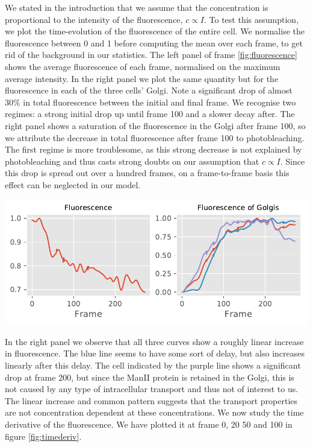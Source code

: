 \documentclass{Dissertate}
\let\origfigure\figure
\let\endorigfigure\endfigure
\renewenvironment{figure}[1][2] {
    \expandafter\origfigure\expandafter[H]
} {
    \endorigfigure
}
\begin{document}
We stated in the introduction that we assume that the concentration is proportional to the intensity of the fluorescence, $c\propto I$. To test this assumption, we plot the time-evolution of the fluorescence of the entire cell. We normalise the fluorescence between 0 and 1 before computing the mean over each frame, to get rid of the background in our statistics. The left panel of frame \ref{fig:fluorescence} shows the average fluorescence of each frame, normalised on the maximum average intensity. In the right panel we plot the same quantity but for the fluorescence in each of the three cells' Golgi. Note a significant drop of almost \(30\%\) in total fluorescence between the initial and final frame. We recognise two regimes: a strong initial drop up until frame 100 and a slower decay after. The right panel shows a saturation of the fluorescence in the Golgi after frame 100, so we attribute the decrease in total fluorescence after frame 100 to photobleaching. 
The first regime is more troublesome, as this strong decrease is not explained by photobleaching and thus casts strong doubts on our assumption that $c \propto I$. Since this drop is spread out over a hundred frames, on a frame-to-frame basis this effect can be neglected in our model.

\begin{figure}
	\centering
	\includegraphics{source/figures/pdf/general_fluorescence.pdf}
	\caption{\textbf{Left panel:} Normalised total fluorescence per frame. \textbf{Right panel:}Normalised fluorescence in each of the three cells' Golgi.\label{fig:fluorescence}}
\end{figure}

In the right panel we observe that all three curves show a roughly linear increase in fluorescence. The blue line seems to have some sort of delay, but also increases linearly after this delay. The cell indicated by the purple line shows a significant drop at frame 200, but
since the ManII protein is retained in the Golgi, this is not caused by any
type of intracellular transport and thus not of interest to us. The
linear increase and common pattern suggests that the transport
properties are not concentration dependent at these concentrations. We now study the time derivative of the fluorescence. We have plotted it at frame 0, 20 50 and 100 in figure \ref{fig:timederiv}.
\end{document}
